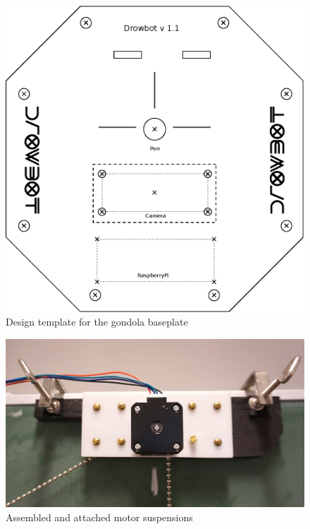 \documentclass[a4paper,10pt]{article}
\begin{document}
\begin{figure}[p]
  \centering
  \includegraphics{img/gondola.eps}
  \caption{Design template for the gondola baseplate}
  \label{fig:baseplate}
\end{figure}

\begin{figure}[p]
  \centering
  \includegraphics{img/motorsusp.jpg}
  \caption{Assembled and attached motor suspensions}
  \label{fig:motors}
\end{figure}
\end{document}
